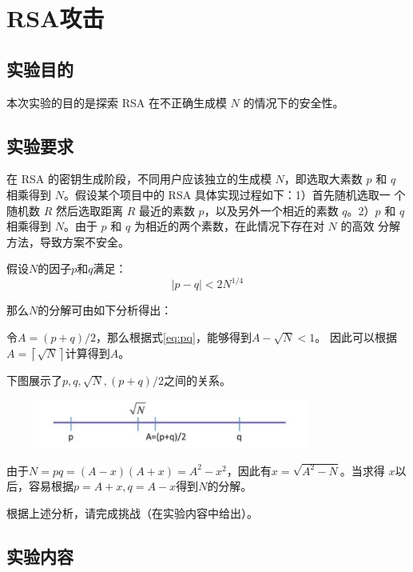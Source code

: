 \chapter{RSA攻击}

\section{实验目的}

本次实验的目的是探索 RSA 在不正确生成模 $N$ 的情况下的安全性。

\section{实验要求}

在 RSA 的密钥生成阶段，不同用户应该独立的生成模 $N$，即选取大素数 $p$ 和 $q$
相乘得到 $N$。假设某个项目中的 RSA 具体实现过程如下：1）首先随机选取一
个随机数 $R$ 然后选取距离 $R$ 最近的素数 $p$，以及另外一个相近的素数 $q$。2）$p$
和 $q$ 相乘得到 $N$。由于 $p$ 和 $q$ 为相近的两个素数，在此情况下存在对 $N$ 的高效
分解方法，导致方案不安全。

假设$N$的因子$p$和$q$满足：
\begin{equation}
    \label{eq:pq}
    |p-q|<2N^{1/4}
\end{equation}

那么$N$的分解可由如下分析得出：

令$A=(p+q)/2$，那么根据式\ref{eq:pq}，能够得到$A-\sqrt{N}<1$。
因此可以根据$A=\left\lceil \sqrt{N}\right\rceil $计算得到$A$。

下图展示了$p,q,\sqrt{N},(p+q)/2$之间的关系。

\begin{figure}[!htbp]
    \centering
    \includegraphics[width=0.8\textwidth]{figures/RSA.png}
\end{figure}

由于$N=pq=(A-x)(A+x)=A^2-x^2$，因此有$x=\sqrt{A^2 - N}$。当求得
$x$以后，容易根据$p=A+x,q=A-x$得到$N$的分解。

根据上述分析，请完成挑战（在实验内容中给出）。

\section{实验内容}

